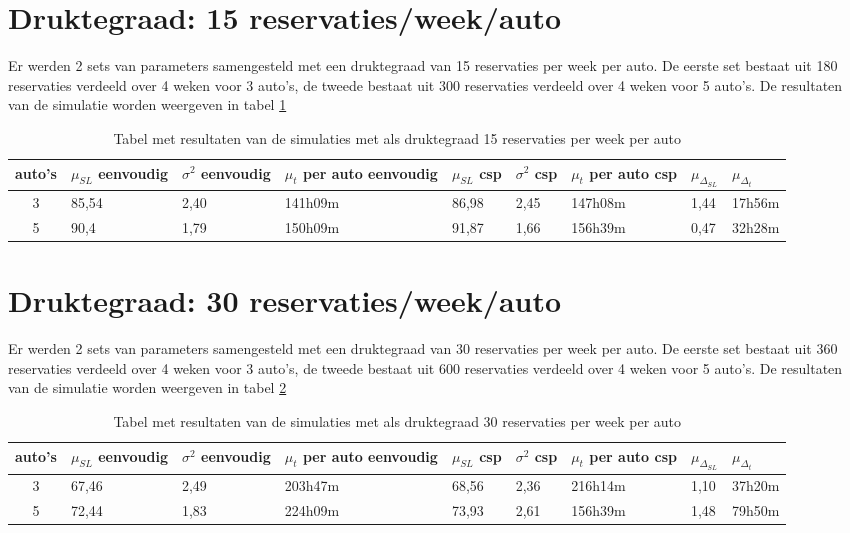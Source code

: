 \section{Druktegraad: 15 reservaties/week/auto}
Er werden 2 sets van parameters samengesteld met een druktegraad van 15 reservaties per week per auto. 
De eerste set bestaat uit 180 reservaties verdeeld over 4 weken voor 3 auto's, de tweede bestaat uit 300 reservaties verdeeld over 4 weken voor 5 auto's. 
De resultaten van de simulatie worden weergeven in tabel \ref{tab:resultaten15}
\begin{table}[h]
	\centering
	\begin{tabular}{ | c | p{1.5cm} | p{1.5cm} | p{1.5cm} | p{1.5cm} | p{1.5cm} | p{1.5cm} | p{1.5cm} | p{1.5cm} |}
		\hline
		auto's & $\mu_{ SL}$ eenvoudig & $\sigma^2$ eenvoudig & $\mu_{ t}$ per auto eenvoudig & $\mu_{ SL}$ csp & $\sigma^2$ csp & $\mu_{ t}$ per auto csp & $\mu_{\Delta_{ SL}}$ & $\mu_{\Delta_{ t}}$ \\ \hline
		3 & 85,54 & 2,40 & 141h09m & 86,98 & 2,45 & 147h08m & 1,44 & 17h56m  \\ \hline
		5 & 90,4 & 1,79 & 150h09m & 91,87 & 1,66 & 156h39m & 0,47 & 32h28m \\ \hline
	\end{tabular}
	\caption{Tabel met resultaten van de simulaties met als druktegraad 15 reservaties per week per auto}
	\label{tab:resultaten15}
\end{table}
\section{Druktegraad: 30 reservaties/week/auto}
Er werden 2 sets van parameters samengesteld met een druktegraad van 30 reservaties per week per auto. 
De eerste set bestaat uit 360 reservaties verdeeld over 4 weken voor 3 auto's, de tweede bestaat uit 600 reservaties verdeeld over 4 weken voor 5 auto's. 
De resultaten van de simulatie worden weergeven in tabel \ref{tab:resultaten30}
\begin{table}[h]
	\centering
	\begin{tabular}{ | c | p{1.5cm} | p{1.5cm} | p{1.5cm} | p{1.5cm} | p{1.5cm} | p{1.5cm} | p{1.5cm} | p{1.5cm} |}
		\hline
		auto's & $\mu_{ SL}$ eenvoudig & $\sigma^2$ eenvoudig & $\mu_{ t}$ per auto eenvoudig & $\mu_{ SL}$ csp & $\sigma^2$ csp & $\mu_{ t}$ per auto csp & $\mu_{\Delta_{ SL}}$ & $\mu_{\Delta_{ t}}$ \\ \hline
		3 & 67,46 & 2,49 & 203h47m & 68,56 & 2,36 & 216h14m & 1,10 & 37h20m  \\ \hline
		5 & 72,44 & 1,83 & 224h09m & 73,93 & 2,61 & 156h39m & 1,48 & 79h50m \\ \hline
	\end{tabular}
	\caption{Tabel met resultaten van de simulaties met als druktegraad 30 reservaties per week per auto}
	\label{tab:resultaten30}
\end{table}

